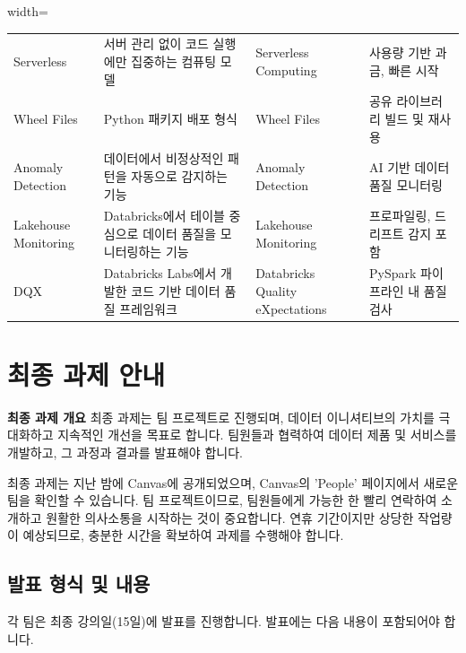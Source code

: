 \documentclass[11pt,a4paper]{article}
\theoremstyle{definition}
\begin{document}
\begin{table}[h!]
\begin{adjustbox}{width=\textwidth}
\begin{tabular}{llll}
Serverless & 서버 관리 없이 코드 실행에만 집중하는 컴퓨팅 모델 & Serverless Computing & 사용량 기반 과금, 빠른 시작 \\
Wheel Files & Python 패키지 배포 형식 & Wheel Files & 공유 라이브러리 빌드 및 재사용 \\
Anomaly Detection & 데이터에서 비정상적인 패턴을 자동으로 감지하는 기능 & Anomaly Detection & AI 기반 데이터 품질 모니터링 \\
Lakehouse Monitoring & Databricks에서 테이블 중심으로 데이터 품질을 모니터링하는 기능 & Lakehouse Monitoring & 프로파일링, 드리프트 감지 포함 \\
DQX & Databricks Labs에서 개발한 코드 기반 데이터 품질 프레임워크 & Databricks Quality eXpectations & PySpark 파이프라인 내 품질 검사 \\
\bottomrule
\end{tabular}
\end{adjustbox}
\end{table}

\newpage
\section{최종 과제 안내}

\begin{tcolorbox}[conceptbox] %
\textbf{최종 과제 개요}
최종 과제는 팀 프로젝트로 진행되며, 데이터 이니셔티브의 가치를 극대화하고 지속적인 개선을 목표로 합니다. 팀원들과 협력하여 데이터 제품 및 서비스를 개발하고, 그 과정과 결과를 발표해야 합니다.
\end{tcolorbox}

최종 과제는 지난 밤에 Canvas에 공개되었으며, Canvas의 'People' 페이지에서 새로운 팀을 확인할 수 있습니다. 팀 프로젝트이므로, 팀원들에게 가능한 한 빨리 연락하여 소개하고 원활한 의사소통을 시작하는 것이 중요합니다. 연휴 기간이지만 상당한 작업량이 예상되므로, 충분한 시간을 확보하여 과제를 수행해야 합니다.

\subsection{발표 형식 및 내용}
각 팀은 최종 강의일(15일)에 발표를 진행합니다. 발표에는 다음 내용이 포함되어야 합니다.
\end{document}
